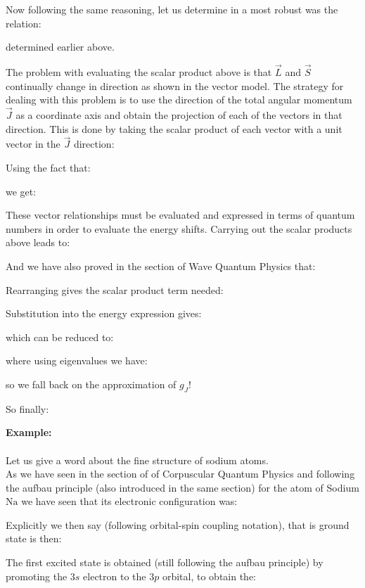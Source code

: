 	Now following the same reasoning, let us determine in a most robust was the relation:
	
	determined earlier above.
	
	The problem with evaluating the scalar product above is that $\vec{L}$ and $\vec{S}$ continually change in direction as shown in the vector model. The strategy for dealing with this problem is to use the direction of the total angular momentum $\vec{J}$ as a coordinate axis and obtain the projection of each of the vectors in that direction. This is done by taking the scalar product of each vector with a unit vector in the $\vec{J}$ direction:
	
	Using the fact that:
	
	we get:
	
	These vector relationships must be evaluated and expressed in terms of quantum numbers in order to evaluate the energy shifts. Carrying out the scalar products above leads to:
	
	And we have also proved in the section of Wave Quantum Physics that:
	
	Rearranging gives the scalar product term needed:
	
	Substitution into the energy expression gives:
	
	which can be reduced to:
	
	where using eigenvalues we have:
	
	so we fall back on the approximation of $g_J$!
	
	So finally:
	
	
	\begin{tcolorbox}[colframe=black,colback=white,sharp corners]
	\textbf{{\Large {}}Example:}\\\\
	Let us give a word about the fine structure of sodium atoms.\\
	
	As we have seen in the section of of Corpuscular Quantum Physics and following the aufbau principle (also introduced in the same section) for the atom of Sodium $\mathrm{Na}$ we have seen that its electronic configuration was:
	
	Explicitly we then say (following orbital-spin coupling notation), that is ground state is then:
	
	The first excited state is obtained (still following the aufbau principle) by promoting the $3s$ electron to the $3p$ orbital, to obtain the:	
	\end{tcolorbox}
	
